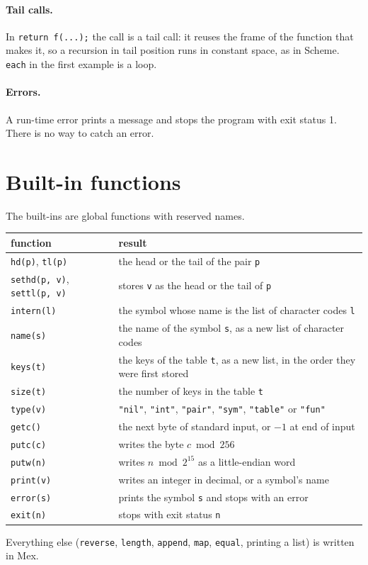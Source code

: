 \documentclass[11pt,a4paper]{article}
\newcommand{\lang}{Mex}
\begin{document}
\paragraph{Tail calls.} In \verb|return f(...);| the call is a tail call:
it reuses the frame of the function that makes it, so a recursion in tail
position runs in constant space, as in Scheme. \verb|each| in the first
example is a loop.

\paragraph{Errors.} A run-time error prints a message and stops the program
with exit status 1. There is no way to catch an error.

\section{Built-in functions}

The built-ins are global functions with reserved names.

\begin{center}
\small
\begin{tabularx}{\linewidth}{@{}l X@{}}
\toprule
function & result\\
\midrule
\texttt{hd(p)}, \texttt{tl(p)} & the head or the tail of the pair \verb|p|\\
\texttt{sethd(p, v)}, \texttt{settl(p, v)} & stores \verb|v| as the head or the tail of \verb|p|\\
\texttt{intern(l)} & the symbol whose name is the list of character codes \verb|l|\\
\texttt{name(s)} & the name of the symbol \verb|s|, as a new list of character codes\\
\texttt{keys(t)} & the keys of the table \verb|t|, as a new list, in the order they were first stored\\
\texttt{size(t)} & the number of keys in the table \verb|t|\\
\texttt{type(v)} & \verb|"nil"|, \verb|"int"|, \verb|"pair"|, \verb|"sym"|, \verb|"table"| or \verb|"fun"|\\
\texttt{getc()} & the next byte of standard input, or $-1$ at end of input\\
\texttt{putc(c)} & writes the byte $c \bmod 256$\\
\texttt{putw(n)} & writes $n \bmod 2^{15}$ as a little-endian word\\
\texttt{print(v)} & writes an integer in decimal, or a symbol's name\\
\texttt{error(s)} & prints the symbol \verb|s| and stops with an error\\
\texttt{exit(n)} & stops with exit status \verb|n|\\
\bottomrule
\end{tabularx}
\end{center}
Everything else (\texttt{reverse}, \texttt{length}, \texttt{append},
\texttt{map}, \texttt{equal}, printing a list) is written in \lang.
\end{document}
